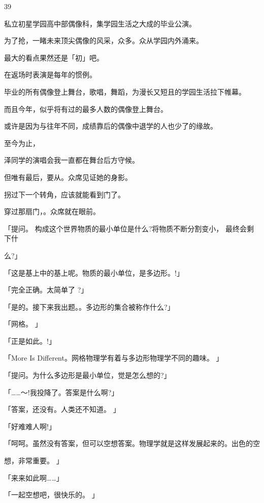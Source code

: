 39\par
私立初星学园高中部偶像科，集学园生活之大成的毕业公演。\par
为了抢，一睹未来顶尖偶像的风采，众多。众从学园内外涌来。\par
最大的看点果然还是「初」吧。\par
在返场时表演是每年的惯例。\par
毕业的所有偶像登上舞台，歌唱，舞蹈，为漫长又短且的学园生活拉下帷幕。\par
而且今年，似乎将有过的最多人数的偶像登上舞台。\par
或许是因为与往年不同，成绩靠后的偶像中退学的人也少了的缘故。\par
至今为止，\par
泽同学的演唱会我一直都在舞台后方守候。\par
但唯有最后，要从。众席见证她的身影。\par
拐过下一个转角，应该就能看到门了。\par
穿过那扇门，。众席就在眼前。\par
「提问。 构成这个世界物质的最小单位是什么?将物质不断分割变小， 最终会剩下什\par
么?」\par
「这是基上中的基上呢。物质的最小单位，是多边形。!」\par
「完全正确。太简单了 ?」\par
「是的。接下来我出题。。多边形的集合被称作什么?」\par
「网格。 」\par
「正是如此。!」\par
「More Is Different。网格物理学有着与多边形物理学不同的趣味。 」\par
「提问。为什么多边形是最小单位，觉是怎么想的?」\par
「……～!我投降了。答案是什么啊?」\par
「答案，还没有。人类还不知道。 」\par
「好难难人啊!」\par
「呵呵。虽然没有答案，但可以空想答案。物理学就是这样发展起来的。出色的空\par
想，非常重要。 」\par
「来来如此啊……」\par
「一起空想吧，很快乐的。 」\par

